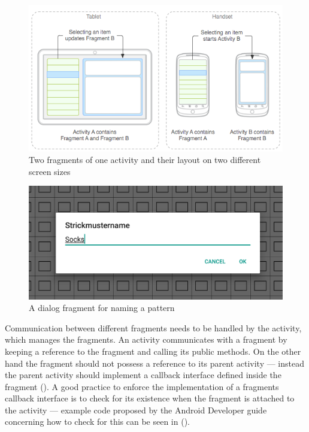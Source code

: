 \begin{figure}[h]
  \centering
    \includegraphics[width=.7\textwidth]{images/fragments.png}
   \caption[Two fragments of one activity and their layout on two different screen sizes. \protect{}]{Two fragments of one activity and their layout on two different screen sizes} 
    \label{fig:fragments_uimodules} 
\end{figure}

\begin{figure}[H]
  \centering
  \includegraphics[width=.7\textwidth]{images/pattern_name_dialog.png}
  \caption[A dialog fragment for naming a pattern \protect{}]{A dialog fragment for naming a pattern} 
  \label{fig:fragment_dialog} 
\end{figure}

Communication between different fragments needs to be handled by the activity, which manages the fragments. An activity communicates with a fragment by keeping a reference to the fragment and calling its public methods. On the other hand the fragment should not possess a reference to its parent activity --- instead the parent activity should implement a callback interface defined inside the fragment (\cite{fragment_event_callback}). A good practice to enforce the implementation of a fragments callback interface is to check for its existence when the fragment is attached to the activity --- example code proposed by the Android Developer guide concerning how to check for this can be seen in  (\cite{fragment_event_callback}).

